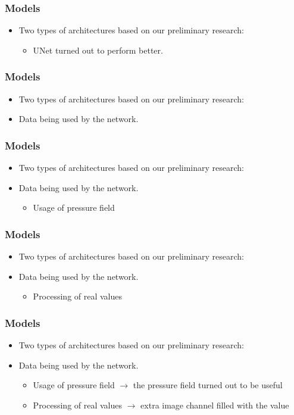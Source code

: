 \documentclass[18pt]{beamer}
\begin{document}
\begin{frame}[t]
  \frametitle{Models}
  \begin{itemize}
  \item Two types of architectures based on our preliminary research:
    \begin{itemize}
    \item UNet turned out to perform better.
    \end{itemize}
  \end{itemize}
\end{frame}


\begin{frame}[t]
  \frametitle{Models}
  \begin{itemize}
  \item Two types of architectures based on our preliminary research:
  \item Data being used by the network.
  \end{itemize}
\end{frame}

\begin{frame}[t]
  \frametitle{Models}
  \begin{itemize}
  \item Two types of architectures based on our preliminary research:
  \item Data being used by the network.
    \begin{itemize}
    \item Usage of pressure field
    \end{itemize}
  \end{itemize}
\end{frame}

\begin{frame}[t]
  \frametitle{Models}
  \begin{itemize}
  \item Two types of architectures based on our preliminary research:
  \item Data being used by the network.
    \begin{itemize}
    \item Processing of real values
    \end{itemize}
  \end{itemize}
\end{frame}


\begin{frame}[t]
  \frametitle{Models}
  \begin{itemize}
  \item Two types of architectures based on our preliminary research:
  \item Data being used by the network.
    \begin{itemize}
    \item Usage of pressure field $\rightarrow$ the pressure field turned out to be useful
    \item Processing of real values $\rightarrow$ extra image channel filled with the value
    \end{itemize}
  \end{itemize}
\end{frame}
\end{document}
